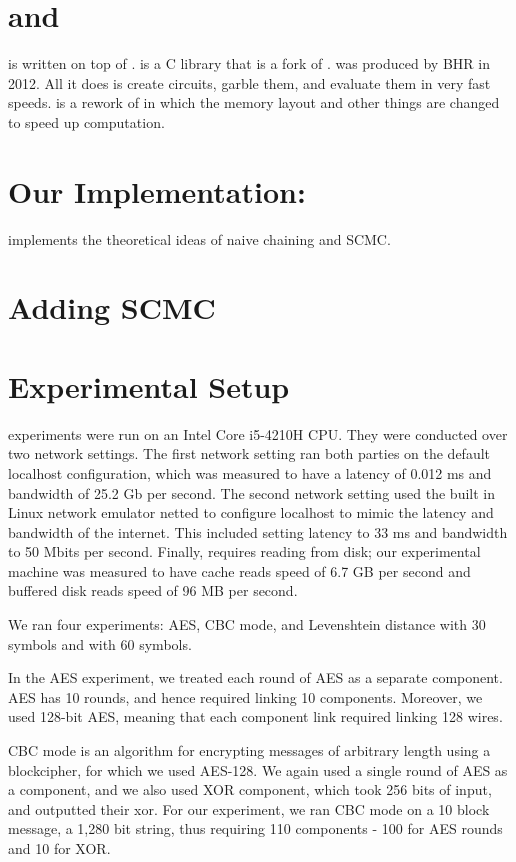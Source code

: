 \section{\LibGarble and \JustGarble}

 \CompGC is written on top of \LibGarble.
\LibGarble is a C library that is a fork of \JustGarble.
\JustGarble was produced by BHR in 2012.
All it does is create circuits, garble them, and evaluate them in very fast speeds.
\LibGarble is a rework of \JustGarble in which the memory layout and other things are changed to speed up computation.

\section{Our Implementation: \CompGC}
\CompGC implements the theoretical ideas of naive chaining and SCMC.



\section{Adding SCMC}

\section{Experimental Setup}
\CompGC experiments were run on an Intel Core i5-4210H CPU. 
They were conducted over two network settings. 
The first network setting ran both parties on the default localhost configuration, which was measured to have a latency of 0.012 ms and bandwidth of 25.2 Gb per second. 
The second network setting used the built in Linux network emulator {\sf netted} to configure localhost to mimic the latency and bandwidth of the internet. 
This included setting latency to 33 ms and bandwidth to 50 Mbits per second. 
Finally, \CompGC requires reading from disk; our experimental machine was measured to have cache reads speed of 6.7 GB per second and buffered disk reads speed of 96 MB per second.

We ran four experiments: AES, CBC mode, and Levenshtein distance with 30 symbols and with 60 symbols. 

In the AES experiment, we treated each round of AES as a separate component. AES has 10 rounds, and hence required linking 10 components. Moreover, we used 128-bit AES, meaning that each component link required linking 128 wires. 

CBC mode is an algorithm for encrypting messages of arbitrary length using a blockcipher, for which we used AES-128. 
We again used a single round of AES as a component, and we also used XOR component, which took 256 bits of input, and outputted their xor. 
For our experiment, we ran CBC mode on a 10 block message, a 1,280 bit string, thus requiring 110 components - 100 for AES rounds and 10 for XOR. 

